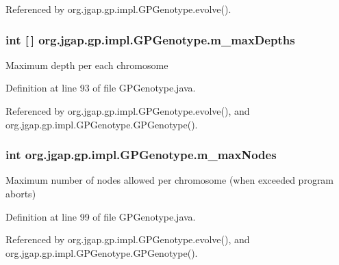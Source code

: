 Referenced by org.\-jgap.\-gp.\-impl.\-G\-P\-Genotype.\-evolve().

\hypertarget{classorg_1_1jgap_1_1gp_1_1impl_1_1_g_p_genotype_a7e95fd6aefeefa158ca044abccc0ffa9}{
\subsubsection[{m\-\_\-max\-Depths}]{\setlength{\rightskip}{0pt plus 5cm}int \mbox{[}$\,$\mbox{]} org.\-jgap.\-gp.\-impl.\-G\-P\-Genotype.\-m\-\_\-max\-Depths\hspace{0.3cm}{\ttfamily [private]}}}\label{classorg_1_1jgap_1_1gp_1_1impl_1_1_g_p_genotype_a7e95fd6aefeefa158ca044abccc0ffa9}
Maximum depth per each chromosome 

Definition at line 93 of file G\-P\-Genotype.\-java.



Referenced by org.\-jgap.\-gp.\-impl.\-G\-P\-Genotype.\-evolve(), and org.\-jgap.\-gp.\-impl.\-G\-P\-Genotype.\-G\-P\-Genotype().

\hypertarget{classorg_1_1jgap_1_1gp_1_1impl_1_1_g_p_genotype_ab15e0e8d3ee0ba8c1e56727f2a2f32ed}{
\subsubsection[{m\-\_\-max\-Nodes}]{\setlength{\rightskip}{0pt plus 5cm}int org.\-jgap.\-gp.\-impl.\-G\-P\-Genotype.\-m\-\_\-max\-Nodes\hspace{0.3cm}{\ttfamily [private]}}}\label{classorg_1_1jgap_1_1gp_1_1impl_1_1_g_p_genotype_ab15e0e8d3ee0ba8c1e56727f2a2f32ed}
Maximum number of nodes allowed per chromosome (when exceeded program aborts) 

Definition at line 99 of file G\-P\-Genotype.\-java.



Referenced by org.\-jgap.\-gp.\-impl.\-G\-P\-Genotype.\-evolve(), and org.\-jgap.\-gp.\-impl.\-G\-P\-Genotype.\-G\-P\-Genotype().

